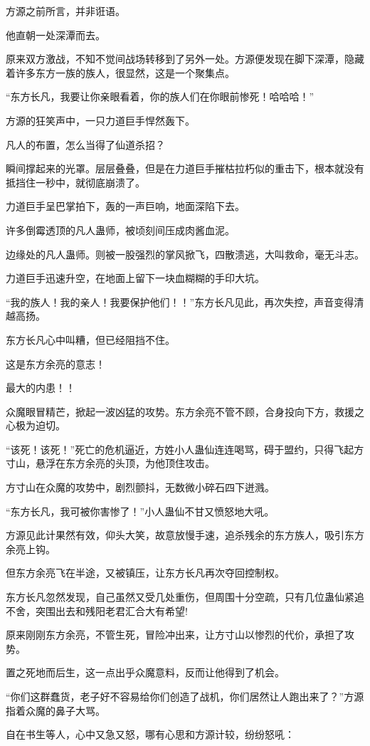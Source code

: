 \begin{this_body}
方源之前所言，并非诳语。

他直朝一处深潭而去。

原来双方激战，不知不觉间战场转移到了另外一处。方源便发现在脚下深潭，隐藏着许多东方一族的族人，很显然，这是一个聚集点。

“东方长凡，我要让你亲眼看着，你的族人们在你眼前惨死！哈哈哈！”

方源的狂笑声中，一只力道巨手悍然轰下。

凡人的布置，怎么当得了仙道杀招？

瞬间撑起来的光罩。层层叠叠，但是在力道巨手摧枯拉朽似的重击下，根本就没有抵挡住一秒中，就彻底崩溃了。

力道巨手呈巴掌拍下，轰的一声巨响，地面深陷下去。

许多倒霉透顶的凡人蛊师，被顷刻间压成肉酱血泥。

边缘处的凡人蛊师。则被一股强烈的掌风掀飞，四散溃逃，大叫救命，毫无斗志。

力道巨手迅速升空，在地面上留下一块血糊糊的手印大坑。

“我的族人！我的亲人！我要保护他们！！”东方长凡见此，再次失控，声音变得清越高扬。

东方长凡心中叫糟，但已经阻挡不住。

这是东方余亮的意志！

最大的内患！！

众魔眼冒精芒，掀起一波凶猛的攻势。东方余亮不管不顾，合身投向下方，救援之心极为迫切。

“该死！该死！”死亡的危机逼近，方姓小人蛊仙连连喝骂，碍于盟约，只得飞起方寸山，悬浮在东方余亮的头顶，为他顶住攻击。

方寸山在众魔的攻势中，剧烈颤抖，无数微小碎石四下迸溅。

“东方长凡，我可被你害惨了！”小人蛊仙不甘又愤怒地大吼。

方源见此计果然有效，仰头大笑，故意放慢手速，追杀残余的东方族人，吸引东方余亮上钩。

但东方余亮飞在半途，又被镇压，让东方长凡再次夺回控制权。

东方长凡忽然发现，自己虽然又受几处重伤，但周围十分空疏，只有几位蛊仙紧追不舍，突围出去和残阳老君汇合大有希望!

原来刚刚东方余亮，不管生死，冒险冲出来，让方寸山以惨烈的代价，承担了攻势。

置之死地而后生，这一点出乎众魔意料，反而让他得到了机会。

“你们这群蠢货，老子好不容易给你们创造了战机，你们居然让人跑出来了？”方源指着众魔的鼻子大骂。

自在书生等人，心中又急又怒，哪有心思和方源计较，纷纷怒吼：


\end{this_body}
